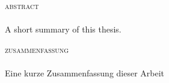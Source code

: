 \pagestyle{plain.scrheadings}	
\setcounter{page}{1}		
\cleardoublepage
\begin{center}
\parbox{0.95\textwidth}{
{\large\scshape\lsstyle\lowercase{Abstract}}\\ \vspace{-0.3cm} 
\HRule \\[0.4cm]
A short summary of this thesis.\\[1cm]


\begin{otherlanguage}{ngerman}
{\large\scshape\lsstyle\lowercase{Zusammenfassung}}\\ \vspace{-0.3cm}
\HRule \\[0.4cm]
Eine kurze Zusammenfassung dieser Arbeit
\end{otherlanguage}}
\end{center}


\tableofcontents
\listoffigures
\begingroup
\let\clearpage\relax
\listoftables
\printglossary[style=mylong,type=\acronymtype,title={list of abbreviations}]
\endgroup

\cleardoublepage
{}			
\pagestyle{scrheadings}				
\setcounter{page}{1}			
